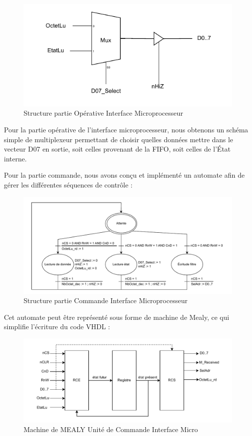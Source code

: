 \begin{figure}[H]
    \centering
    \includegraphics[width=0.8\linewidth]{images/inter/Structure_Interface_Micro.pdf}
    \caption{Structure partie Opérative Interface Microprocesseur}
    \label{fig:placeholder}
\end{figure}

Pour la partie opérative de l’interface microprocesseur, nous obtenons un schéma simple de multiplexeur permettant de choisir quelles données mettre dans le vecteur D07 en sortie, soit celles provenant de la FIFO, soit celles de l’État interne.
\newline

Pour la partie commande, nous avons conçu et implémenté un automate afin de gérer les différentes séquences de contrôle : 
\newline


\begin{figure}[H]
    \centering
    \includegraphics[width=0.8\linewidth]{images/inter/Automate_Interface_Micro.pdf}
    \caption{Structure partie Commande Interface Microprocesseur}
    \label{fig:placeholder}
\end{figure}

Cet automate peut être représenté sous forme de machine de Mealy, ce qui simplifie l’écriture du code VHDL : 

\begin{figure}[H]
    \centering
    \includegraphics[width=0.8\linewidth]{images/inter/MEALY_Interface_Micro.pdf}
    \caption{Machine de MEALY Unité de Commande Interface Micro}
    \label{fig:placeholder}
\end{figure}

